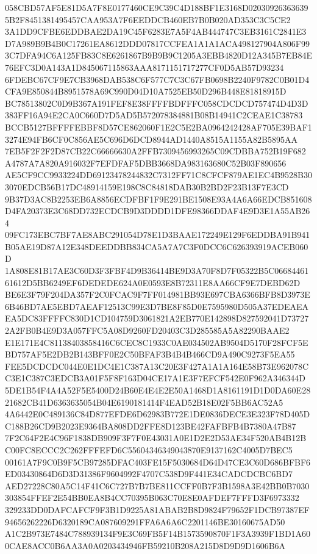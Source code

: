 \documentclass[UTF8,fontset=fandol,zihao=-4,a4paper]{ctexart}
\begin{document}
{{058CBD57AF5E81D5A7F8E0177460CE9C39C4D188BF1E3168D020309263636395B2F8451381495457CAA953A7F6EEDDCB460EB7B0B020AD353C3C5CE2
3A1DD9CFBE6EDDBAE2DA19C45F6283E7A5F4AB444747C3EB3161C2841E3D7A989B9B4B0C17261EA8612DDD07817CCFEA1A1A1ACA498127904A806F99
3C7DFA94C6A125FB83C8E6261867B9B9B9C1205A3EBB4820D12A345B7EB84E76EFC3D0A143A1D845067115863AAA8171151717277CF0D5AB57D93234
6FDEBC67CF9E7CB3968DAB538C6F577C7C3C67FB0698B2240F9782C0B01D4CFA9E850844B8951578A69C990D04D10A7525EB50D296B448E81818915D
BC78513802C0D9B367A191FEF8E38FFFFBDFFFC058CDCDCD757474D4D3D383FF16A94E2CA0C660D7D5AD5B572078384881B08B14941C2CEAE1C38783
BCCB5127BFFFFEBBF8D57CE862060F1E2C5E2BA0964242428AF705E39BAF13274E94FB6CF0C856AE5C696D6DCD8944AD1440A8515A1155A82B5895AA
7EB5F2F2F2D87CB22C66666630A2FFB7309456993265C09CDBBA752B19F682A4787A7A820A916032F7EFDFAF5DBB3668DA983163680C52B03F890656
AE5CF9CC9933224DD69123478244832C7312FF71C8CFCF879AE1EC4B9528B303070EDCB56B17DC48914159E198C8C84818DAB30B2BD2F23B13F7E3CD
9B37D3AC8B2253EB6A8856ECDFBF1F9E291BE1508E93A4A6A66EDCB851608D4FA20373E3C68DD732ECDCB9D3DDDD1DFE98366DDAF4E9D3E1A55AB264
09FC173EBC7BF7AE8ABC291054D78E1D3BAAE172249E129F6EDDBA91B941B05AE19D87A12E348DEEDDBB834CA5A7A7C3F0DCC6C626393919ACEB060D
1A808E81B17AE3C60D3F3FBF4D9B36414BE9D3A70F8D7F05322B5C0668446161612D5BB6249EF6DEDEDE624A0E0593E8B72311E8AA66CF9E7DEBD62D
BE6E3F79F204DA357F2C0FCAC9F7FF014981BB93E697CBA6366BFB8D3973E6B46BD7AE5EBD7AEAF12513C99E3D7BE8F85D0E7595980D505A37EDEAEA
EA5DC83FFFFC830D1CD104759D3061821A2EB770E142898D827592041D737272A2FB0B4E9D3A057FFC5A08D9260FD20403C3D285585A5A82290BAAE2
E1E171E4C81138403858416C6CEC8C1933C0AE034502AB9504D5170F28FCF5EBD757AF5E2DB2B143BFF0E2C50BFAF3B4B4B466CD9A490C9273F5EA55
FEE5DCDCDC044E0E1DC4E1C387A13C20E3F427A1A1A164E58B73E962078CC3E1C387C3EDCB3A01F5F8F163D04CE17A1E3F7EFCF542E0F962A346344D
5DE1B54F4A4A52F5E5400D24B60E4E4E2E50A1468D1A8161191D1D0DA60E2821682CB41D6363635054B04E6190181414F4EAD52B18E02F5BB6AC52A5
4A6442E0C489136C84D877EFDE6D62983B772E1DE0836DECE3E323F78D405DC188B26CD9B2023E9364BA808DD2FFE8D123BE42FAFBFB4B7380A47B87
7F2C64F2E4C96F1838DB909F3F7F0E43031A0E1D2E2D53AE34F520AB4B12BC00FC8ECCC2C262FFFEFD6C55604346349043870E9137162C4005D7BEC5
00161A7F9C0B9F5CB97285DFAC403FE15F5030684D64D47CE3C60D686BFBF6ED03430864D6D3D31386F9604992F4707C538D9F441E34CADCDCBC6BD7
AED27228C80A5C14F41C6C727B7B7BE811CCFF0B7F3B1598A3E42BB0B7030303854FFEF2E54BB0EA8B4CC70395B063C70E8E0AFDEF7FFFD3F6973332
329233DD0DAFCAFCF9F3B1D9225A81ABAB2B8D9824F79652F1DCB97387EF94656262226D6320189CA087609291FFA6A6A6C2201146BE30160675AD50
A1C2B973E7484C788939134F9E3C69FB5F14B1573590870F1F3A3939F1BD1A600CAE8ACC0B6AA3A0A0203434946FB59210B208A215D8D9D9D1606B6A
}}
\end{document}
